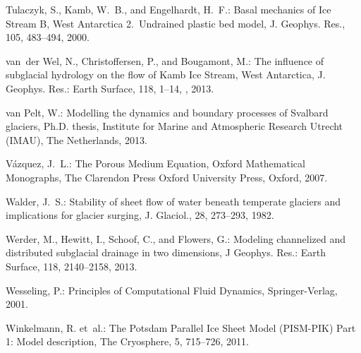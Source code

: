 \documentclass[gmd]{copernicus}   %
\begin{document}
\begin{thebibliography}{}
Tulaczyk, S., Kamb, W.~B., and Engelhardt, H.~F.: Basal mechanics of {I}ce
  {S}tream {B}, {W}est {A}ntarctica 2.~{U}ndrained plastic bed model, J.
  Geophys. Res., 105, 483--494, 2000{}.

van~der Wel, N., Christoffersen, P., and Bougamont, M.: The influence of
  subglacial hydrology on the flow of {K}amb {I}ce {S}tream, {W}est
  {A}ntarctica, J. Geophys. Res.: Earth Surface, 118, 1--14,
  , 2013.

van Pelt, W.: Modelling the dynamics and boundary processes of {S}valbard
  glaciers, Ph.D. thesis, Institute for Marine and Atmospheric Research Utrecht
  (IMAU), The Netherlands, 2013.

V{\'a}zquez, J.~L.: The {P}orous {M}edium {E}quation, Oxford Mathematical
  Monographs, The Clarendon Press Oxford University Press, Oxford, 2007.

Walder, J.~S.: Stability of sheet flow of water beneath temperate glaciers and
  implications for glacier surging, J. Glaciol., 28, 273--293, 1982.

Werder, M., Hewitt, I., Schoof, C., and Flowers, G.: Modeling channelized and
  distributed subglacial drainage in two dimensions, J Geophys. Res.: Earth
  Surface, 118, 2140--2158, 2013.

Wesseling, P.: Principles of {C}omputational {F}luid {D}ynamics,
  Springer-Verlag, 2001.

Winkelmann, R. et~al.: The {P}otsdam {P}arallel {I}ce {S}heet
  {M}odel ({PISM-PIK}) {P}art 1: {M}odel description, The Cryosphere, 5,
  715--726, 2011.
\end{thebibliography}


\appendix
\end{document}
